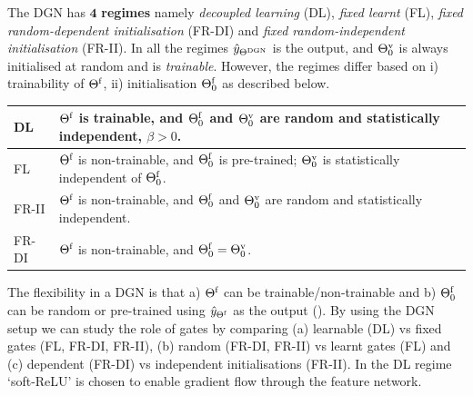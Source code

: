\begin{definition}\label{rm:regime}The DGN has $\mathbf{4}$ \textbf{regimes} namely \emph{decoupled learning} (DL), \emph{fixed learnt} (FL), \emph{fixed random-dependent initialisation} (FR-DI) and \emph{fixed random-independent initialisation} (FR-II). 
In all the regimes $\hat{y}_{\Theta^{\text{DGN}}}$ is the output, and ${\Theta}^{\text{v}}_0$ is always initialised at random and is \emph{trainable}. However, the regimes differ based on i) trainability of $\Theta^{\textrm{f}}$, ii) initialisation $\Theta^{\textrm{f}}_0$ as described below.\\
\begin{tabular}{|l|p{6cm}|}\hline
DL               & $\Theta^{\textrm{f}}$ is trainable, and $\Theta^{\textrm{f}}_0$ and ${\Theta}^{\text{v}}_0$ are random and statistically independent,  $\beta>0$.\\\hline
FL               & $\Theta^{\textrm{f}}$ is non-trainable, and $\Theta^{\textrm{f}}_0$ is pre-trained;  ${\Theta}^{\text{v}}_0$ is statistically independent of $\Theta^{\textrm{f}}_0$. \\\hline
FR-II            & $\Theta^{\textrm{f}}$ is non-trainable, and $\Theta^{\textrm{f}}_0$ and ${\Theta}^{\text{v}}_0$ are random and statistically independent.\\\hline
FR-DI   &  $\Theta^{\textrm{f}}$ is non-trainable, and $\Theta^{\textrm{f}}_0={\Theta}^{\text{v}}_0$.\\\hline
\end{tabular}
\end{definition}
The flexibility in a DGN is that  a) $\Theta^{\textrm{f}}$ can be trainable/non-trainable and b) $\Theta^{\textrm{f}}_0$ can be random or pre-trained using $\hat{y}_{{\Theta}^{\text{f}}}$ as the output (). By using the DGN setup we can study the role of gates by comparing (a) learnable (DL) vs fixed gates (FL, FR-DI, FR-II), (b) random (FR-DI, FR-II) vs learnt gates (FL) and (c) dependent (FR-DI) vs independent initialisations (FR-II). In the DL regime `soft-ReLU' is chosen to enable gradient flow through the feature network.
